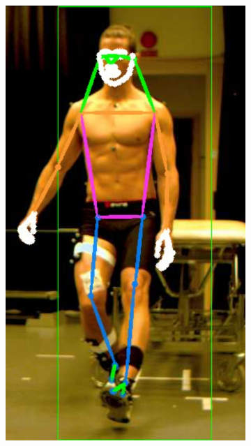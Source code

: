 {\begin{figure}[h]
\begin{subfigure}[t]{0.22\textwidth}
    \includegraphics[height=1.3\textwidth]{files/figs/res/hpe/36-6.png}
    \caption{}
  \end{subfigure}
  ~
  \begin{subfigure}[t]{0.22\textwidth}
    \centering

\end{subfigure}
\end{figure}}
